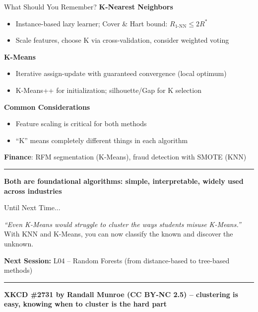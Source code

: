 \documentclass[8pt,aspectratio=169]{beamer}
\newcommand{\bottomnote}[1]{%
\vfill
\vspace{-2mm}
\textcolor{mllavender2}{\rule{\textwidth}{0.4pt}}
\vspace{1mm}
\footnotesize
\textbf{#1}
}
\begin{document}
\begin{frame}[t]{What Should You Remember?}
\textbf{K-Nearest Neighbors}
\begin{itemize}
\item Instance-based lazy learner; Cover \& Hart bound: $R_{1\text{-NN}} \leq 2R^*$
\item Scale features, choose K via cross-validation, consider weighted voting
\end{itemize}
\vspace{0.3em}
\textbf{K-Means}
\begin{itemize}
\item Iterative assign-update with guaranteed convergence (local optimum)
\item K-Means++ for initialization; silhouette/Gap for K selection
\end{itemize}
\vspace{0.3em}
\textbf{Common Considerations}
\begin{itemize}
\item Feature scaling is critical for both methods
\item ``K'' means completely different things in each algorithm
\end{itemize}
\vspace{0.3em}
\textbf{Finance}: RFM segmentation (K-Means), fraud detection with SMOTE (KNN)
\bottomnote{Both are foundational algorithms: simple, interpretable, widely used across industries}
\end{frame}

\begin{frame}[t]{Until Next Time...}
\begin{center}
\textit{``Even K-Means would struggle to cluster the ways students misuse K-Means.''}\\[0.5em]
With KNN and K-Means, you can now classify the known and discover the unknown.
\end{center}
\vspace{1em}
\textbf{Next Session:} L04 -- Random Forests (from distance-based to tree-based methods)
\bottomnote{XKCD \#2731 by Randall Munroe (CC BY-NC 2.5) -- clustering is easy, knowing when to cluster is the hard part}
\end{frame}
\end{document}
